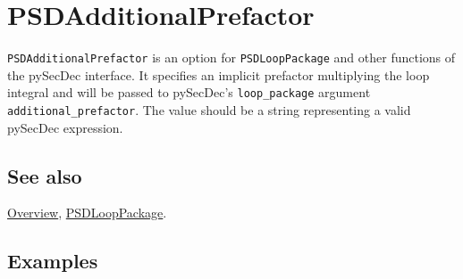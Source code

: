 \documentclass[../FeynHelpersManual.tex]{subfiles}
\begin{document}
\hypertarget{psdadditionalprefactor}{
\section{PSDAdditionalPrefactor}\label{psdadditionalprefactor}}

\texttt{PSDAdditionalPrefactor} is an option for \texttt{PSDLoopPackage}
and other functions of the pySecDec interface. It specifies an implicit
prefactor multiplying the loop integral and will be passed to pySecDec's
\texttt{loop_package} argument \texttt{additional_prefactor}. The value
should be a string representing a valid pySecDec expression.

\subsection{See also}

\hyperlink{toc}{Overview}, \hyperlink{psdlooppackage}{PSDLoopPackage}.

\subsection{Examples}
\end{document}
